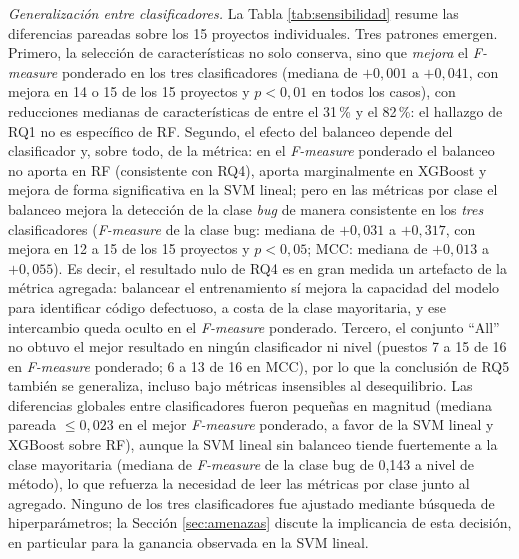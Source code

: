 \documentclass[conference,a4paper]{IEEEtran}
\begin{document}
\textit{Generalización entre clasificadores.} La Tabla \ref{tab:sensibilidad} resume las diferencias pareadas sobre los 15 proyectos individuales. Tres patrones emergen. Primero, la selección de características no solo conserva, sino que \textit{mejora} el \textit{F-measure} ponderado en los tres clasificadores (mediana de $+0{,}001$ a $+0{,}041$, con mejora en 14 o 15 de los 15 proyectos y $p<0{,}01$ en todos los casos), con reducciones medianas de características de entre el 31\,\% y el 82\,\%: el hallazgo de RQ1 no es específico de RF. Segundo, el efecto del balanceo depende del clasificador y, sobre todo, de la métrica: en el \textit{F-measure} ponderado el balanceo no aporta en RF (consistente con RQ4), aporta marginalmente en XGBoost y mejora de forma significativa en la SVM lineal; pero en las métricas por clase el balanceo mejora la detección de la clase \textit{bug} de manera consistente en los \textit{tres} clasificadores (\textit{F-measure} de la clase bug: mediana de $+0{,}031$ a $+0{,}317$, con mejora en 12 a 15 de los 15 proyectos y $p<0{,}05$; MCC: mediana de $+0{,}013$ a $+0{,}055$). Es decir, el resultado nulo de RQ4 es en gran medida un artefacto de la métrica agregada: balancear el entrenamiento sí mejora la capacidad del modelo para identificar código defectuoso, a costa de la clase mayoritaria, y ese intercambio queda oculto en el \textit{F-measure} ponderado. Tercero, el conjunto ``All'' no obtuvo el mejor resultado en ningún clasificador ni nivel (puestos 7 a 15 de 16 en \textit{F-measure} ponderado; 6 a 13 de 16 en MCC), por lo que la conclusión de RQ5 también se generaliza, incluso bajo métricas insensibles al desequilibrio. Las diferencias globales entre clasificadores fueron pequeñas en magnitud (mediana pareada $\leq 0{,}023$ en el mejor \textit{F-measure} ponderado, a favor de la SVM lineal y XGBoost sobre RF), aunque la SVM lineal sin balanceo tiende fuertemente a la clase mayoritaria (mediana de \textit{F-measure} de la clase bug de 0,143 a nivel de método), lo que refuerza la necesidad de leer las métricas por clase junto al agregado. Ninguno de los tres clasificadores fue ajustado mediante búsqueda de hiperparámetros; la Sección \ref{sec:amenazas} discute la implicancia de esta decisión, en particular para la ganancia observada en la SVM lineal.
\end{document}
